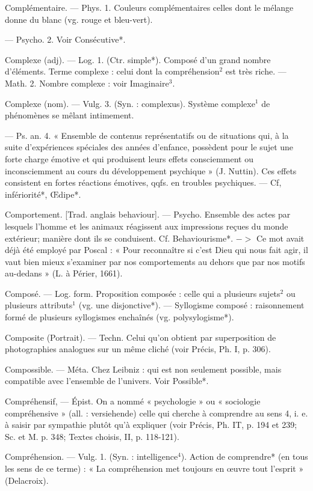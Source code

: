 Complémentaire. — Phys. 1. Couleurs
complémentaires celles dont le
mélange donne du blanc (vg. rouge
et bleu-vert).

— Psycho. 2. Voir Consécutive*.

Complexe (adj). — Log. 1. (Ctr.
simple*). Composé d’un grand nombre d'éléments. Terme complexe :
celui dont la compréhension$^2$ est
très riche. — Math. 2. Nombre complexe : voir Imaginaire$^3$.

Complexe (nom). — Vulg. 3. (Syn. :
complexus). Système complexe$^1$ de
phénomènes se mêlant intimement.

— Ps. an. 4. « Ensemble de contenus représentatifs ou de situations qui, à la suite d'expériences
spéciales des années d'enfance, possèdent pour le sujet une forte charge
émotive et qui produisent leurs
effets consciemment ou inconsciemment au cours du développement
psychique » (J. Nuttin). Ces effets
consistent en fortes réactions émotives, qqfs. en troubles psychiques.
— Cf, infériorité*, Œdipe*.

Comportement. [Trad. anglais behaviour]. — Psycho. Ensemble des
actes par lesquels l’homme et les
animaux réagissent aux impressions
reçues du monde extérieur; manière
dont ils se conduisent. Cf. Behaviourisme*. $->$ Ce mot avait déjà
été employé par Poscal : « Pour
reconnaître si c'est Dieu qui nous
fait agir, il vaut bien mieux s’examiner par nos comportements au
dehors que par nos motifs au-dedans »
(L. à Périer, 1661).

Composé. — Log. form. Proposition
composée : celle qui a plusieurs
sujets$^2$ ou plusieurs attributs$^1$ (vg.
une disjonctive*). — Syllogisme
composé : raisonnement formé de
plusieurs syllogismes enchaînés (vg.
polysylogisme*).

Composite (Portrait). — Techn. Celui
qu’on obtient par superposition
de photographies analogues sur
un même cliché (voir Précis, Ph. I,
p. 306).

Compossible. — Méta. Chez Leibniz :
qui est non seulement possible,
mais compatible avec l'ensemble de
l'univers. Voir Possible*.

Compréhensif, — Épist. On a nommé
« psychologie » ou « sociologie compréhensive » (all. : versiehende) celle
qui cherche à comprendre au sens 4,
i. e. à saisir par sympathie plutôt
qu’à expliquer (voir Précis, Ph. IT,
p. 194 et 239; Sc. et M. p. 348;
Textes choisis, II, p. 118-121).

Compréhension. — Vulg. 1. (Syn. :
intelligence$^4$). Action de comprendre*
(en tous les sens de ce terme) : « La
compréhension met toujours en
œuvre tout l'esprit » (Delacroix).

